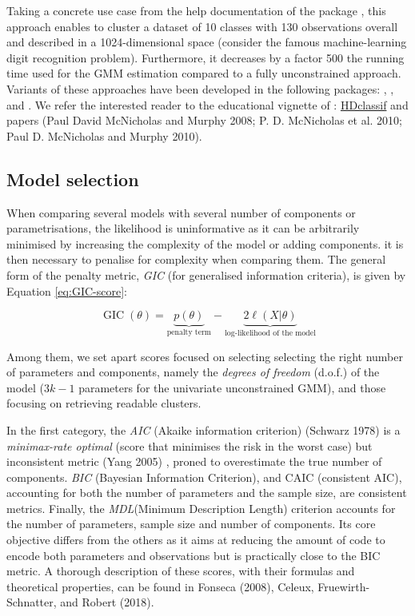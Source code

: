 Taking a concrete use case from the help documentation of the package , this approach enables to cluster a dataset of 10 classes with 130 observations overall and described in a 1024-dimensional space (consider the famous machine-learning digit recognition problem). Furthermore, it decreases by a factor 500 the running time used for the GMM estimation compared to a fully unconstrained approach. Variants of these approaches have been developed in the following packages: , ,  and . We refer the interested reader to the educational vignette of : \href{https://rdrr.io/pkg/HDclassif/man/HDclassif-package.html}{HDclassif} and papers (Paul David McNicholas and Murphy 2008; P. D. McNicholas et al. 2010; Paul D. McNicholas and Murphy 2010).

\hypertarget{model-selection}{%
\subsection{Model selection}\label{model-selection}}

When comparing several models with several number of components or
parametrisations, the likelihood is uninformative as it can be
arbitrarily minimised by increasing the complexity of the model or
adding components. it is then necessary to penalise for complexity when
comparing them. The general form of the penalty metric, \emph{GIC} (for
generalised information criteria), is given by Equation
\eqref{eq:GIC-score}:

\begin{equation}
    \operatorname{GIC} (\theta) =  \underbrace{p(\theta)}_{\text{penalty term}} - \underbrace{2 \ell (X | \theta)}_{\text{log-likelihood of the model}}
\label{eq:GIC-score}
\end{equation}

Among them, we set apart scores focused on selecting selecting the right
number of parameters and components, namely the \emph{degrees of freedom}
(d.o.f.) of the model (\(3k-1\) parameters for the univariate
unconstrained GMM), and those focusing on retrieving readable clusters.

In the first category, the \emph{AIC} (Akaike information criterion)
(Schwarz 1978) is a \emph{minimax-rate optimal} (score that minimises the risk
in the worst case) but inconsistent metric (Yang 2005) , proned to
overestimate the true number of components. \emph{BIC} (Bayesian Information
Criterion), and CAIC (consistent AIC), accounting for both the number of
parameters and the sample size, are consistent metrics. Finally, the
\emph{MDL}(Minimum Description Length) criterion accounts for the number of
parameters, sample size and number of components. Its core objective
differs from the others as it aims at reducing the amount of code to
encode both parameters and observations but is practically close to the
BIC metric. A thorough description of these scores, with their formulas
and theoretical properties, can be found in Fonseca (2008), Celeux, Fruewirth-Schnatter, and Robert (2018).

